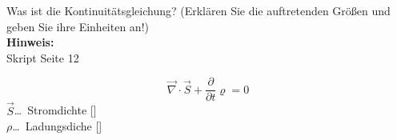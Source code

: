 \begin{question}[section=2,name={Koninutätsgleichung},difficulty=,quantity=1,type=thr,tags={20160310,20130513}]
	Was ist die Kontinuitätsgleichung? (Erklären Sie die auftretenden Größen und geben Sie ihre Einheiten an!)
	\\ \textbf{Hinweis:}\\
	Skript Seite 12
\end{question}
\begin{solution}
	\begin{equation}
	\vec{\nabla} \cdot \vec{S} + \frac{\partial}{\partial t} \varrho = 0
\end{equation}
	$\vec{S}$\dots\ Stromdichte [\ampere\per\metre]\\
	$\rho$\dots\ Ladungsdiche [\ampere\second\per\metre]
\end{solution}